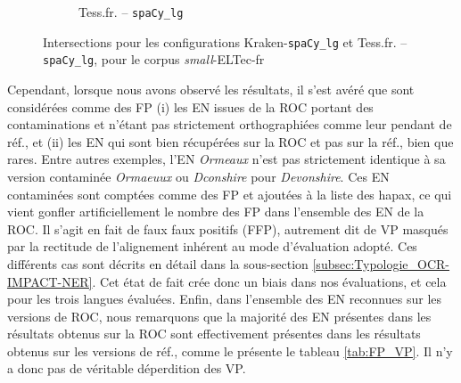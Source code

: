 \begin{figure}[h!]
\begin{minipage}{6.5cm}
\begin{subfigure}{1\textwidth}
  \caption{Tess.fr. -- \texttt{spaCy\_lg}}
 \label{fig:ELTeCFRA_Tess_spaCy3.5.1-concat_intersection}
  \end{subfigure}
    \end{minipage}
\caption{Intersections pour les configurations Kraken-\texttt{spaCy\_lg} et Tess.fr. -- \texttt{spaCy\_lg}, pour le corpus \textit{small}-ELTec-fr}
\label{fig:intersection_globale-kraken-tess}
\end{figure}

Cependant, lorsque nous avons observé les résultats, il s'est avéré que sont considérées comme des FP (i) les EN issues de la ROC portant des contaminations et n'étant pas strictement orthographiées comme leur pendant de réf., et (ii) les EN qui sont bien récupérées sur la ROC et pas sur la réf., bien que rares. Entre autres exemples, l'EN \og{}\textit{Ormeaux}\fg{} n'est pas strictement identique à sa version contaminée \og{}\textit{Ormaeuux}\fg{} ou \og{}\textit{Dconshire}\fg{} pour \og{}\textit{Devonshire}\fg{}. Ces EN contaminées sont comptées comme des FP et ajoutées à la liste des hapax, ce qui vient gonfler artificiellement le nombre des FP dans l'ensemble des EN de la ROC. Il s'agit en fait de faux faux positifs (FFP), autrement dit de VP masqués par la rectitude de l'alignement inhérent au mode d'évaluation adopté. Ces différents cas sont décrits en détail dans la sous-section \ref{subsec:Typologie_OCR-IMPACT-NER}. Cet état de fait crée donc un biais dans nos évaluations, et cela pour les trois langues évaluées.
 Enfin, dans l'ensemble des EN reconnues sur les versions de ROC, nous remarquons que la majorité des EN présentes dans les résultats obtenus sur la ROC sont effectivement présentes dans les résultats obtenus sur les versions de réf., comme le présente le tableau \ref{tab:FP_VP}. Il n'y a donc pas de véritable déperdition des VP. 

